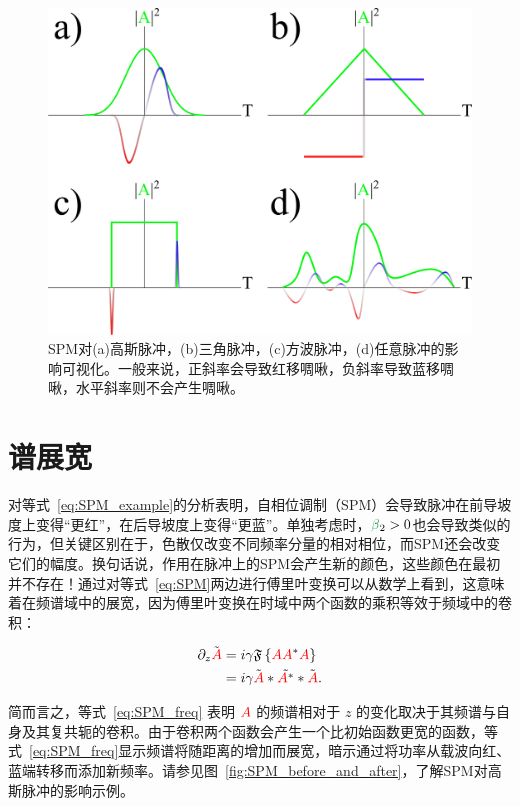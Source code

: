 \begin{figure}
    \centering
    \includegraphics[width=0.75\linewidth]{figures/SPM_chirp.png}
    \caption{SPM对(a)高斯脉冲，(b)三角脉冲，(c)方波脉冲，(d)任意脉冲的影响可视化。一般来说，正斜率会导致红移啁啾，负斜率导致蓝移啁啾，水平斜率则不会产生啁啾。}
    \label{fig:chirp_profiles}
\end{figure}

\section{谱展宽}
对等式~\ref{eq:SPM_example}的分析表明，自相位调制（SPM）会导致脉冲在前导坡度上变得“更红”，在后导坡度上变得“更蓝”。单独考虑时，$\betag_2>0$也会导致类似的行为，但关键区别在于，色散仅改变不同频率分量的相对相位，而SPM还会改变它们的幅度。换句话说，作用在脉冲上的SPM会产生新的颜色，这些颜色在最初并不存在！通过对等式~\ref{eq:SPM}两边进行傅里叶变换可以从数学上看到，这意味着在频谱域中的展宽，因为傅里叶变换在时域中两个函数的乘积等效于频域中的卷积：

\begin{align}
\label{eq:SPM_freq}
    \partial_z\Tilde{\textcolor{red}{A}} &= i\gamma \mathfrak{F}\left\{\textcolor{red}{A}\textcolor{red}{A}^*\textcolor{red}{A}\right\} \\ \nonumber
    &= i\gamma \Tilde{\textcolor{red}{A}}*\Tilde{\textcolor{red}{A}^*}*\Tilde{\textcolor{red}{A}}.
\end{align}

简而言之，等式~\ref{eq:SPM_freq} 表明 $\textcolor{red}{A}$ 的频谱相对于 $z$ 的变化取决于其频谱与自身及其复共轭的卷积。由于卷积两个函数会产生一个比初始函数更宽的函数，等式~\ref{eq:SPM_freq}显示频谱将随距离的增加而展宽，暗示通过将功率从载波向红、蓝端转移而添加新频率。请参见图~\ref{fig:SPM_before_and_after}，了解SPM对高斯脉冲的影响示例。

